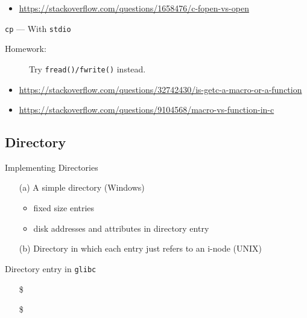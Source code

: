 \begin{itemize}
\item \url{https://stackoverflow.com/questions/1658476/c-fopen-vs-open}
\end{itemize}

\begin{frame}{\texttt{cp} --- {\small With} \texttt{stdio}}
  \begin{center}
  \end{center}
  \begin{description}
  \item[Homework:] Try \texttt{fread()/fwrite()} instead.
  \end{description}
\end{frame}

\begin{itemize}
\item \url{https://stackoverflow.com/questions/32742430/is-getc-a-macro-or-a-function}
\item \url{https://stackoverflow.com/questions/9104568/macro-vs-function-in-c}
\end{itemize}

\subsection{Directory}
\label{sec:directory}

\begin{frame}{Implementing Directories}
  \begin{center}
  \end{center}
  \begin{itemize}
  \item[(a)] A simple directory (Windows)
    \begin{itemize}
    \item fixed size entries
    \item disk addresses and attributes in directory entry
    \end{itemize}
  \item[(b)] Directory in which each entry just refers to an i-node (UNIX)
  \end{itemize}
\end{frame}

\begin{frame}%
  \begin{block}{Directory entry in \texttt{glibc}}
  \end{block}
  \begin{itemize}
  \item[\$] 
  \item[\$] 
  \end{itemize}
\end{frame}

